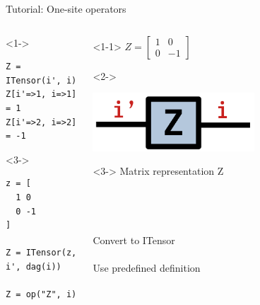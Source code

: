 \begin{frame}[fragile]{Tutorial: One-site operators}

\begin{columns}

\begin{column}{4.5cm}

\begin{onlyenv}<1->
\begin{lstlisting}[language=JuliaLocal, style=julia, basicstyle=\small]
Z = ITensor(i', i)
Z[i'=>1, i=>1] = 1
Z[i'=>2, i=>2] = -1
\end{lstlisting}
\end{onlyenv}

\begin{onlyenv}<3->
\begin{lstlisting}[language=JuliaLocal, style=julia, basicstyle=\small]
z = [
  1 0
  0 -1
]

Z = ITensor(z, i', dag(i))

Z = op("Z", i)
\end{lstlisting}
\end{onlyenv}

\end{column}

\begin{column}{4.5cm}

\begin{onlyenv}<1-1>
$Z = \begin{bmatrix} 1 & 0 \\ 0 & -1 \end{bmatrix}$
\end{onlyenv}

\begin{onlyenv}<2->
\begin{center}
\includegraphics[width=0.6\textwidth]{
  slides/assets/Z.png
}
\end{center}
\vspace*{0.5cm}
\end{onlyenv}

\begin{onlyenv}<3->
Matrix representation Z \\
~\\
~\\
~\\
~\\
Convert to ITensor \\
~\\
Use predefined definition
\end{onlyenv}

\end{column}

\end{columns}

\end{frame}
